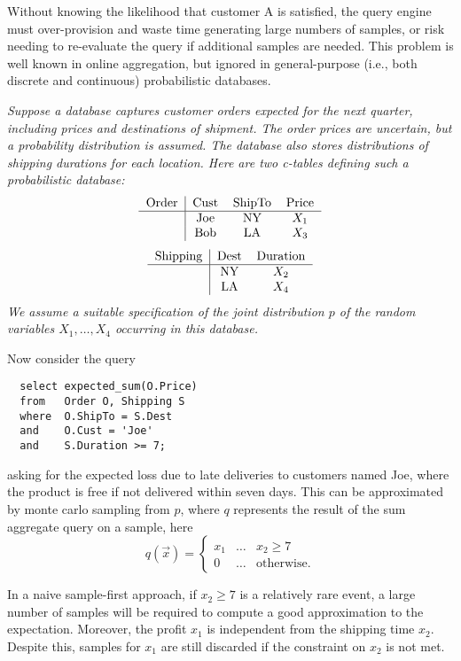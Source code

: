 Without knowing the likelihood that customer A is satisfied, the query engine must over-provision and waste time generating large numbers of samples, or risk needing to re-evaluate the query if additional samples are needed.  This problem is well known in online aggregation, but ignored in general-purpose (i.e., both discrete and continuous) probabilistic databases.  


\begin{example}\em
\label{ex:intro}
Suppose a database captures customer orders expected for the next quarter,
including prices
and destinations of shipment. The order prices are 
uncertain, but a probability distribution is assumed.
The database also stores
distributions of shipping durations for each location.
Here are two c-tables defining such a probabilistic database:
\[
\begin{tabular}{c|ccc}
Order & Cust & ShipTo & Price \\
\hline
& Joe & NY & $X_1$ \\
& Bob & LA & $X_3$ \\
\end{tabular}
\]\[
\begin{tabular}{c|cc}
Shipping & Dest & Duration \\
\hline
& NY & $X_2$ \\
& LA & $X_4$ \\
\end{tabular}
\]
We assume a suitable specification of the joint distribution $p$ of the random
variables $X_1,\dots,X_4$ occurring in this database.

Now consider the query
{\small\begin{verbatim}
  select expected_sum(O.Price)
  from   Order O, Shipping S
  where  O.ShipTo = S.Dest
  and    O.Cust = 'Joe'
  and    S.Duration >= 7;
\end{verbatim}}
asking for the expected loss due to late deliveries to customers named Joe,
where the product is free if not delivered within seven days.
%
This can be approximated by monte carlo sampling from $p$,
where $q$ represents the result of the sum aggregate query on a sample,
here
\[
q(\vec{x}) =
\left\{
\begin{array}{lll}
x_1 & \dots & x_2 \ge 7 \\
0 & \dots & \mbox{otherwise.}
\end{array}
\right.
\]

In a naive sample-first approach, 
if $x_2 \ge 7$ is a relatively rare event, a large number of samples will be
required to compute a good approximation to the expectation.
Moreover, the profit $x_1$ is independent from the shipping time $x_2$.  Despite this, samples for $x_1$ are still discarded if the constraint on $x_2$ is not met.

\end{example}

